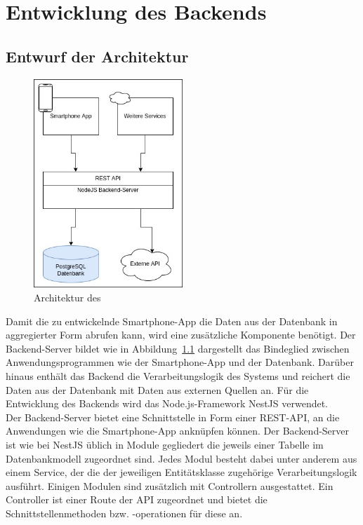 \chapter{Entwicklung des Backends}\label{ch:Entwicklung des Backends}
\section{Entwurf der Architektur}\label{sec:Entwurf der Architektur}

\begin{figure}
    \centering
    \includegraphics[width=0.5\textwidth]{figures/3.1.jpg}
    \caption{Architektur des }
    \label{fig:3.1}
\end{figure}

Damit die zu entwickelnde Smartphone-App die Daten aus der Datenbank in aggregierter Form abrufen kann, wird eine zusätzliche Komponente benötigt. Der Backend-Server bildet wie in Abbildung~\ref{fig:3.1} dargestellt das Bindeglied zwischen Anwendungsprogrammen wie der Smartphone-App und der Datenbank. Darüber hinaus enthält das Backend die Verarbeitungslogik des Systems und reichert die Daten aus der Datenbank mit Daten aus externen Quellen an. Für die Entwicklung des Backends wird das Node.js-Framework NestJS verwendet.\\ Der Backend-Server bietet eine Schnittstelle in Form einer \gls{REST-API}, an die Anwendungen wie die Smartphone-App anknüpfen können. Der Backend-Server ist wie bei NestJS üblich in Module gegliedert die jeweils einer Tabelle im Datenbankmodell zugeordnet sind. Jedes Modul besteht dabei unter anderem aus einem Service, der die der jeweiligen Entitätsklasse zugehörige Verarbeitungslogik ausführt. Einigen Modulen sind zusätzlich mit Controllern ausgestattet. Ein Controller ist einer Route der API zugeordnet und bietet die Schnittstellenmethoden bzw. -operationen für diese an.

